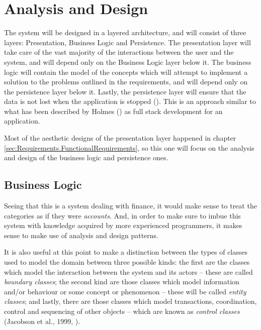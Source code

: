 \section{Analysis and Design} \label{sec:AnalysisAndDesign}

The system will be designed in a layered architecture, and will consist of
three layers: Presentation, Business Logic and Persistence. The presentation
layer will take care of the vast majority of the interactions between the user
and the system, and will depend only on the Business Logic layer below it. The
business logic will contain the model of the concepts which will attempt to
implement a solution to the problems outlined in the requirements, and will
depend only on the persistence layer below it. Lastly, the persistence layer
will ensure that the data is not lost when the application is stopped
(\cite[][p.~32-33]{bauer2016hibernate}). This is an approach similar to what
has been described by Holmes (\citeyear[][p.~3]{holmes2016mean}) as full stack
development for an application.

Most of the aesthetic designs of the presentation layer happened in chapter
\ref{sec:Requirements.FunctionalRequirements}, so this one will focus on the
analysis and design of the business logic and persistence ones.

\subsection{Business Logic} \label{sec:AnalysisAndDesign.BusinessLogic}
Seeing that this is a system dealing with finance, it would make sense to treat
the categories as if they were \emph{accounts}. And, in order to make sure to
imbue this system with knowledge acquired by more experienced programmers, it
makes sense to make use of analysis and design patterns.

It is also useful at this point to make a distinction between the types of
classes used to model the domain between three possible kinds: the first are
the classes which model the interaction between the system and its actors --
these are called \emph{boundary classes}; the second kind are those classes
which model information and/or behaviour or some concept or phenomenon -- these
will be called \emph{entity classes}; and lastly, there are those classes which
model transactions, coordination, control and sequencing of other objects --
which are known as \emph{control classes} (Jacobson et al., 1999,
\cite[cited][pp.~198-201]{bennett2010object}).
%

